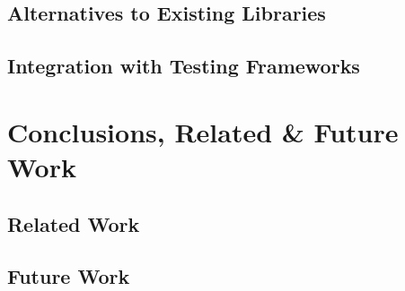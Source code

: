 \documentclass[openright, dottedtoc, headinclude, footinclude=true, a4paper, numbers=noenddot, fontsize=10pt]{scrreprt}
\begin{document}
  \subsection{Alternatives to Existing Libraries}
  \label{sec:practice-alternatives}
  

  \subsection{Integration with Testing Frameworks}
  \label{sec:practice-integration}
  

\section{Conclusions, Related \& Future Work}
\label{chap:conclusions}


  \subsection{Related Work}
  \label{sec:conclusions-related}
  

  \subsection{Future Work}
  \label{sec:conclusions-future}
  

\if@openright
  \cleardoublepage
\else
  \clearpage
\fi



\end{document}
